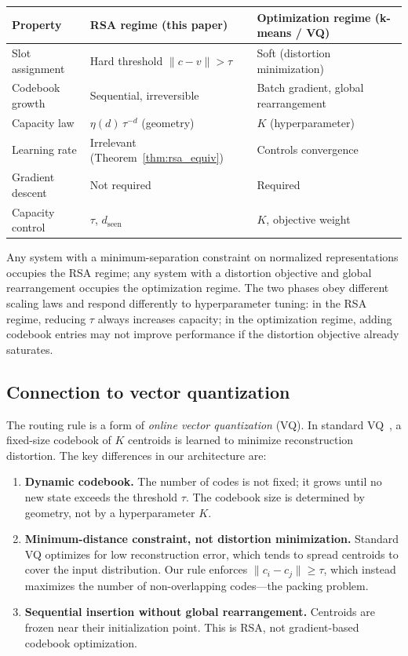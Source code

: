 \documentclass[11pt]{article}
\begin{document}
\begin{center}
\begin{tabular}{lll}
\toprule
\textbf{Property} & \textbf{RSA regime} (this paper) & \textbf{Optimization regime} (k-means / VQ) \\
\midrule
Slot assignment  & Hard threshold $\|c - v\| > \tau$   & Soft (distortion minimization) \\
Codebook growth  & Sequential, irreversible             & Batch gradient, global rearrangement \\
Capacity law     & $\eta(d)\,\tau^{-d}$ (geometry)      & $K$ (hyperparameter) \\
Learning rate    & Irrelevant (Theorem~\ref{thm:rsa_equiv}) & Controls convergence \\
Gradient descent & Not required                         & Required \\
Capacity control & $\tau$, $d_{\text{seen}}$            & $K$, objective weight \\
\bottomrule
\end{tabular}
\end{center}

Any system with a minimum-separation constraint on normalized representations
occupies the RSA regime; any system with a distortion objective and global
rearrangement occupies the optimization regime. The two phases obey different
scaling laws and respond differently to hyperparameter tuning: in the RSA
regime, reducing $\tau$ always increases capacity; in the optimization regime,
adding codebook entries may not improve performance if the distortion objective
already saturates.

\subsection{Connection to vector quantization}

The routing rule is a form of \emph{online vector quantization} (VQ).
In standard VQ~\cite{vq_vae}, a fixed-size codebook of $K$ centroids is
learned to minimize reconstruction distortion.
The key differences in our architecture are:
\begin{enumerate}
  \item \textbf{Dynamic codebook.} The number of codes is not fixed;
    it grows until no new state exceeds the threshold $\tau$.
    The codebook size is determined by geometry, not by a hyperparameter $K$.
  \item \textbf{Minimum-distance constraint, not distortion minimization.}
    Standard VQ optimizes for low reconstruction error, which tends to
    spread centroids to cover the input distribution.
    Our rule enforces $\|c_i - c_j\| \geq \tau$, which instead maximizes
    the number of non-overlapping codes---the packing problem.
  \item \textbf{Sequential insertion without global rearrangement.}
    Centroids are frozen near their initialization point.
    This is RSA, not gradient-based codebook optimization.
\end{enumerate}
\end{document}
